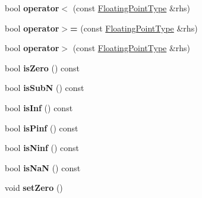 \begin{DoxyCompactItemize}
\item 
\hypertarget{classfap_1_1FloatingPointType_ac74a7b58dd4fff532e10affc83083ea1}{}\label{classfap_1_1FloatingPointType_ac74a7b58dd4fff532e10affc83083ea1} 
bool {\bfseries operator$<$} (const \hyperlink{classfap_1_1FloatingPointType}{Floating\+Point\+Type} \&rhs)
\item 
\hypertarget{classfap_1_1FloatingPointType_a8ad1366a3b349973923fd84bd762c0b2}{}\label{classfap_1_1FloatingPointType_a8ad1366a3b349973923fd84bd762c0b2} 
bool {\bfseries operator$>$=} (const \hyperlink{classfap_1_1FloatingPointType}{Floating\+Point\+Type} \&rhs)
\item 
\hypertarget{classfap_1_1FloatingPointType_ac42658174f0d455de56829781c1d3558}{}\label{classfap_1_1FloatingPointType_ac42658174f0d455de56829781c1d3558} 
bool {\bfseries operator$>$} (const \hyperlink{classfap_1_1FloatingPointType}{Floating\+Point\+Type} \&rhs)
\item 
\hypertarget{classfap_1_1FloatingPointType_a1cbb93d976a0fe84fade02f77ec280e9}{}\label{classfap_1_1FloatingPointType_a1cbb93d976a0fe84fade02f77ec280e9} 
bool {\bfseries is\+Zero} () const
\item 
\hypertarget{classfap_1_1FloatingPointType_a528562ecb5fc3156ae9e36751a86b837}{}\label{classfap_1_1FloatingPointType_a528562ecb5fc3156ae9e36751a86b837} 
bool {\bfseries is\+SubN} () const
\item 
\hypertarget{classfap_1_1FloatingPointType_abc5d8c3cc037c4479552abb09218488f}{}\label{classfap_1_1FloatingPointType_abc5d8c3cc037c4479552abb09218488f} 
bool {\bfseries is\+Inf} () const
\item 
\hypertarget{classfap_1_1FloatingPointType_a14fa7dc64c182350d3818e8174e74ec5}{}\label{classfap_1_1FloatingPointType_a14fa7dc64c182350d3818e8174e74ec5} 
bool {\bfseries is\+Pinf} () const
\item 
\hypertarget{classfap_1_1FloatingPointType_aeb0bcea5139d560c5fc614a5f871bd3f}{}\label{classfap_1_1FloatingPointType_aeb0bcea5139d560c5fc614a5f871bd3f} 
bool {\bfseries is\+Ninf} () const
\item 
\hypertarget{classfap_1_1FloatingPointType_a93e5f9bee036086c80bbd31574d823ce}{}\label{classfap_1_1FloatingPointType_a93e5f9bee036086c80bbd31574d823ce} 
bool {\bfseries is\+NaN} () const
\item 
\hypertarget{classfap_1_1FloatingPointType_a2f0edab95a0adc795121c3ac3b4e16f8}{}\label{classfap_1_1FloatingPointType_a2f0edab95a0adc795121c3ac3b4e16f8} 
void {\bfseries set\+Zero} ()
\item 

\end{DoxyCompactItemize}
